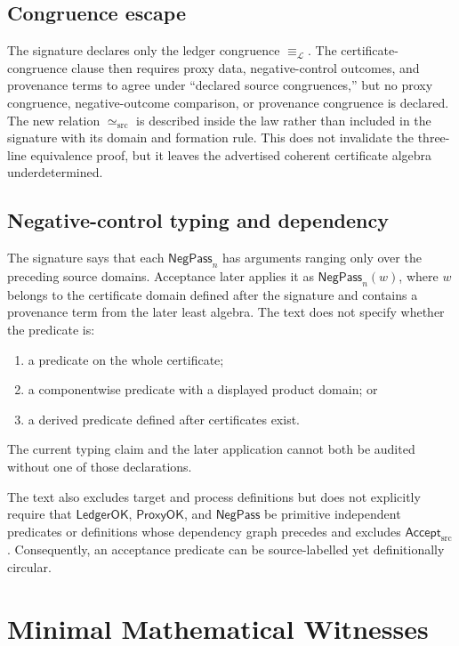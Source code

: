 \documentclass[11pt]{article}
\newcommand{\Accept}{\mathsf{Accept}_{\mathrm{src}}}
\begin{document}
\subsection{Congruence escape}

The signature declares only the ledger congruence
\(\equiv_{\mathcal L}\). The certificate-congruence clause then requires proxy
data, negative-control outcomes, and provenance terms to agree under
``declared source congruences,'' but no proxy congruence, negative-outcome
comparison, or provenance congruence is declared. The new relation
\(\simeq_{\mathrm{src}}\) is described inside the law rather than included in
the signature with its domain and formation rule. This does not invalidate the
three-line equivalence proof, but it leaves the advertised coherent certificate
algebra underdetermined.

\subsection{Negative-control typing and dependency}

The signature says that each \(\mathsf{NegPass}_{n}\) has arguments ranging
only over the preceding source domains. Acceptance later applies it as
\(\mathsf{NegPass}_{n}(w)\), where \(w\) belongs to the certificate domain
defined after the signature and contains a provenance term from the later
least algebra. The text does not specify whether the predicate is:
\begin{enumerate}[leftmargin=*]
  \item a predicate on the whole certificate;
  \item a componentwise predicate with a displayed product domain; or
  \item a derived predicate defined after certificates exist.
\end{enumerate}
The current typing claim and the later application cannot both be audited
without one of those declarations.

The text also excludes target and process definitions but does not explicitly
require that \(\mathsf{LedgerOK}\), \(\mathsf{ProxyOK}\), and
\(\mathsf{NegPass}\) be primitive independent predicates or definitions whose
dependency graph precedes and excludes \(\Accept\). Consequently, an
acceptance predicate can be source-labelled yet definitionally circular.

\section{Minimal Mathematical Witnesses}
\end{document}
